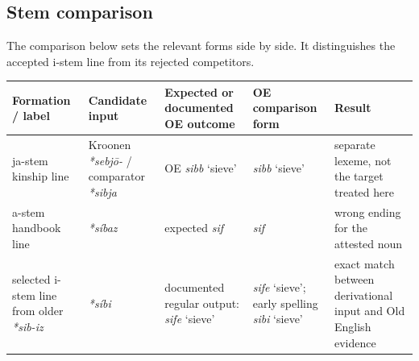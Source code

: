 \documentclass[
  british,
  a4paper,
  openany]{book}
\newcounter{none} %
\begin{document}
\subsection{Stem comparison}\label{stem-comparison-6}

The comparison below sets the relevant forms side by side. It
distinguishes the accepted i-stem line from its rejected competitors.

{\def\LTcaptype{none} %
\begin{longtable}[]{@{}
  >{\raggedright\arraybackslash}p{}
  >{\raggedright\arraybackslash}p{}
  >{\raggedright\arraybackslash}p{}
  >{\raggedright\arraybackslash}p{}
  >{\raggedright\arraybackslash}p{}@{}}
\toprule\noalign{}
\begin{minipage}[b]{\linewidth}\raggedright
Formation / label
\end{minipage} & \begin{minipage}[b]{\linewidth}\raggedright
Candidate input
\end{minipage} & \begin{minipage}[b]{\linewidth}\raggedright
Expected or documented OE outcome
\end{minipage} & \begin{minipage}[b]{\linewidth}\raggedright
OE comparison form
\end{minipage} & \begin{minipage}[b]{\linewidth}\raggedright
Result
\end{minipage} \\
\midrule\noalign{}
\endhead
\bottomrule\noalign{}
\endlastfoot
ja-stem kinship line & Kroonen \emph{*sebjō-} / comparator
{\emph{*sibja}} & OE {\emph{sibb}} `sieve' & {\emph{sibb}} `sieve' &
separate lexeme, not the target treated here \\
a-stem handbook line & {\emph{*síbaz}} & expected {\emph{sif}} &
{\emph{sif}} & wrong ending for the attested noun \\
selected i-stem line from older \emph{*sib-iz} & {\emph{*síbi}} &
documented regular output: {\emph{sife}} `sieve' & {\emph{sife}}
`sieve'; early spelling {\emph{sibi}} `sieve' & exact match between
derivational input and Old English evidence \\
\end{longtable}
}
\end{document}
